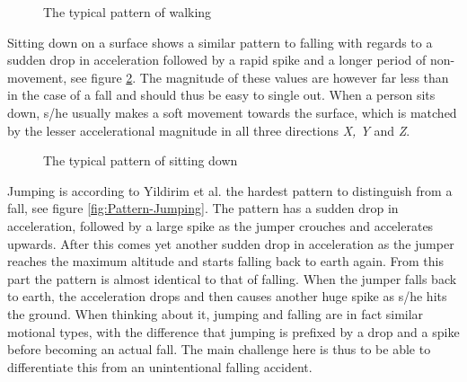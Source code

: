 \documentclass[12pt, a4paper, onecolumn]{article}
\begin{document}
	\begin{figure}[H]
		\centering
		\caption{The typical pattern of walking}%
		\label{fig:Pattern-Walking}%
	\end{figure}
	
	
	 Sitting down on a surface shows a similar pattern to falling with regards to a sudden drop in acceleration followed by a rapid spike and a longer period of non-movement, see figure \ref{fig:Pattern-Sittin}. The magnitude of these values are however far less than in the case of a fall and should thus be easy to single out. When a person sits down, s/he usually makes a soft movement towards the surface, which is matched by the lesser accelerational magnitude in all three directions \textit{X, Y} and \textit{Z}.
	 
	 \begin{figure}[H]
	 	\centering
	 	\caption{The typical pattern of sitting down}%
	 	\label{fig:Pattern-Sittin}%
	 \end{figure}
	
	Jumping is according to Yildirim et al. the hardest pattern to distinguish from a fall, see figure \ref{fig:Pattern-Jumping}. The pattern has a sudden drop in acceleration, followed by a large spike as the jumper crouches and accelerates upwards. After this comes yet another sudden drop in acceleration as the jumper reaches the maximum altitude and starts falling back to earth again. From this part the pattern is almost identical to that of falling. When the jumper falls back to earth, the acceleration drops and then causes another huge spike as s/he hits the ground. When thinking about it, jumping and falling are in fact similar motional types, with the difference that jumping is prefixed by a drop and a spike before becoming an actual fall. The main challenge here is thus to be able to differentiate this from an unintentional falling accident.
	
\end{document}
